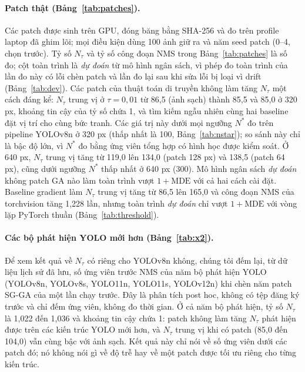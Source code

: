 \documentclass[12pt,a4paper]{article}
\newcommand{\Ntau}{N_{\tau}}
\begin{document}
\paragraph{Patch thật (Bảng~\ref{tab:patches}).}
Các patch được sinh trên GPU, đóng băng bằng SHA-256 và đo trên profile laptop đã ghim lõi; mọi điều kiện dùng 100 ảnh giữ ra và năm seed patch (0--4, chọn trước). Tỷ số $\Ntau$ và tỷ số công đoạn NMS trong Bảng~\ref{tab:patches} là số đo; cột toàn trình là \emph{dự đoán} từ mô hình ngân sách, vì phép đo toàn trình của lần đo này có lỗi chèn patch và lần đo lại sau khi sửa lỗi bị loại vì drift (Bảng~\ref{tab:dev}). Các patch của thuật toán di truyền không làm tăng $\Ntau$ một cách đáng kể: $\Ntau$ trung vị ở $\tau=0{,}01$ từ 86,5 (ảnh sạch) thành 85,5 và 85,0 ở 320 px, khoảng tin cậy của tỷ số chứa 1, và tìm kiếm ngẫu nhiên cùng hai baseline đặt vị trí cho cùng bức tranh. Các giá trị này dưới mọi ngưỡng $N^{*}$ đo trên pipeline YOLOv8n ở 320 px (thấp nhất là 100, Bảng~\ref{tab:nstar}); so sánh này chỉ là bậc độ lớn, vì $N^{*}$ đo bằng ứng viên tổng hợp có hình học được kiểm soát. Ở 640 px, $\Ntau$ trung vị tăng từ 119,0 lên 134,0 (patch 128 px) và 138,5 (patch 64 px), cũng dưới ngưỡng $N^{*}$ thấp nhất ở 640 px (300). Mô hình ngân sách \emph{dự đoán} không patch GA nào làm toàn trình vượt $1+\mathrm{MDE}$ với cả hai cách cài đặt. Baseline gradient làm $\Ntau$ trung vị tăng từ 86,5 lên 165,0 và công đoạn NMS của torchvision tăng 1,228 lần, nhưng toàn trình \emph{dự đoán} chỉ vượt $1+\mathrm{MDE}$ với vòng lặp PyTorch thuần (Bảng~\ref{tab:threshold}).



\paragraph{Các bộ phát hiện YOLO mới hơn (Bảng~\ref{tab:x2}).}
Để xem kết quả về $\Ntau$ có riêng cho YOLOv8n không, chúng tôi đếm lại, từ dữ liệu lịch sử đã lưu, số ứng viên trước NMS của năm bộ phát hiện YOLO (YOLOv8n, YOLOv8s, YOLO11n, YOLO11s, YOLOv12n) khi chèn năm patch SG-GA của một lần chạy trước. Đây là phân tích post hoc, không có tệp đăng ký trước và chỉ đếm ứng viên, không đo thời gian. Ở cả năm bộ phát hiện, tỷ số $\Ntau$ là 1,022 đến 1,036 và khoảng tin cậy chứa 1: patch không làm tăng $\Ntau$ phát hiện được trên các kiến trúc YOLO mới hơn, và $\Ntau$ trung vị khi có patch (85,0 đến 104,0) vẫn cùng bậc với ảnh sạch. Kết quả này chỉ nói về số ứng viên dưới các patch đó; nó không nói gì về độ trễ hay về một patch được tối ưu riêng cho từng kiến trúc.
\end{document}
